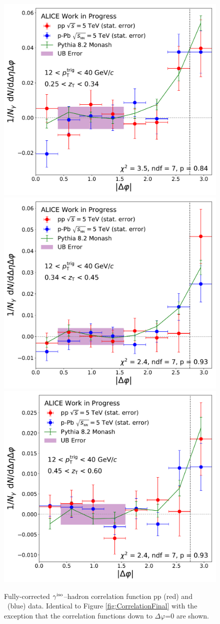 \begin{figure}
\includegraphics[width = 0.24 \textwidth]{G-H_New/dPhi_to_0/Cs_Final_Indv_pT_0_zT_5.pdf}
\includegraphics[width = 0.24 \textwidth]{G-H_New/dPhi_to_0/Cs_Final_Indv_pT_0_zT_6.pdf}
\includegraphics[width = 0.24 \textwidth]{G-H_New/dPhi_to_0/Cs_Final_Indv_pT_0_zT_7.pdf}
\caption{Fully-corrected $\gamma^\mathrm{iso}$--hadron correlation function pp (red) and \pPb~(blue) data. Identical to Figure \ref{fig:CorrelationFinal} with the exception that the correlation functions down to $\Delta\varphi$=0 are shown.}
\label{fig:CorrelationFinal_downtozero}
\end{figure}


